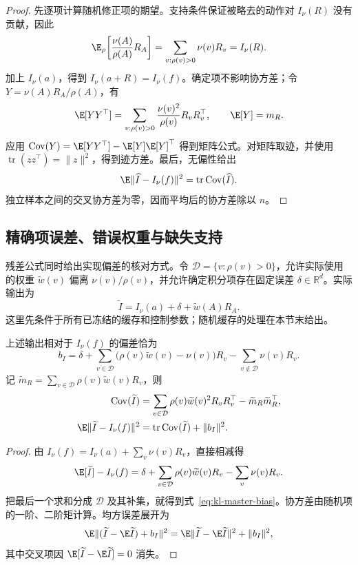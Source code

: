 \begin{proof}
先逐项计算随机修正项的期望。支持条件保证被略去的动作对 $I_\nu(R)$ 没有贡献，因此
\[
 \E_\rho\!\left[\frac{\nu(A)}{\rho(A)}R_A\right]
 =\sum_{v:\rho(v)>0}\nu(v)R_v=I_\nu(R).
\]
加上 $I_\nu(a)$，得到 $I_\nu(a+R)=I_\nu(f)$。确定项不影响协方差；令 $Y=\nu(A)R_A/\rho(A)$，有
\[
 \E[YY^\top]
 =\sum_{v:\rho(v)>0}\frac{\nu(v)^2}{\rho(v)}R_vR_v^\top,
 \qquad \E[Y]=m_R.
\]
应用 $\operatorname{Cov}(Y)=\E[YY^\top]-\E[Y]\E[Y]^\top$ 得到矩阵公式。对矩阵取迹，并使用 $\operatorname{tr}(zz^\top)=\lVert z\rVert^2$，得到迹方差。最后，无偏性给出
\[
 \E\lVert\widehat I-I_\nu(f)\rVert^2
 =\operatorname{tr}\operatorname{Cov}(\widehat I).
\]
独立样本之间的交叉协方差为零，因而平均后的协方差除以 $n$。
\end{proof}

\subsection{精确项误差、错误权重与缺失支持}

残差公式同时给出实现偏差的核对方式。令 $\mathcal D=\{v:\rho(v)>0\}$，允许实际使用的权重 $\widetilde w(v)$ 偏离 $\nu(v)/\rho(v)$，并允许确定积分项存在固定误差 $\delta\in\mathbb R^d$。实际输出为
\[
 \widetilde I=I_\nu(a)+\delta+\widetilde w(A)R_A.
\]
这里先条件于所有已冻结的缓存和控制参数；随机缓存的处理在本节末给出。

\begin{theorem}[三种误差来源的统一偏差]
\label{thm:kl-master-bias}
上述输出相对于 $I_\nu(f)$ 的偏差恰为
\begin{equation}
 b_I=\delta
 +\sum_{v\in\mathcal D}\bigl(\rho(v)\widetilde w(v)-\nu(v)\bigr)R_v
 -\sum_{v\notin\mathcal D}\nu(v)R_v.
 \label{eq:kl-master-bias}
\end{equation}
记 $\widetilde m_R=\sum_{v\in\mathcal D}\rho(v)\widetilde w(v)R_v$，则
\begin{align}
 \operatorname{Cov}(\widetilde I)
 &=\sum_{v\in\mathcal D}\rho(v)\widetilde w(v)^2R_vR_v^\top
 -\widetilde m_R\widetilde m_R^\top,\\
 \E\lVert\widetilde I-I_\nu(f)\rVert^2
 &=\operatorname{tr}\operatorname{Cov}(\widetilde I)+\lVert b_I\rVert^2.
 \label{eq:kl-master-mse}
\end{align}
\end{theorem}

\begin{proof}
由 $I_\nu(f)=I_\nu(a)+\sum_v\nu(v)R_v$，直接相减得
\[
 \E[\widetilde I]-I_\nu(f)
 =\delta+\sum_{v\in\mathcal D}\rho(v)\widetilde w(v)R_v-\sum_v\nu(v)R_v.
\]
把最后一个求和分成 $\mathcal D$ 及其补集，就得到式~\eqref{eq:kl-master-bias}。协方差由随机项的一阶、二阶矩计算。均方误差展开为
\[
 \E\lVert(\widetilde I-\E\widetilde I)+b_I\rVert^2
 =\E\lVert\widetilde I-\E\widetilde I\rVert^2+\lVert b_I\rVert^2,
\]
其中交叉项因 $\E[\widetilde I-\E\widetilde I]=0$ 消失。
\end{proof}

